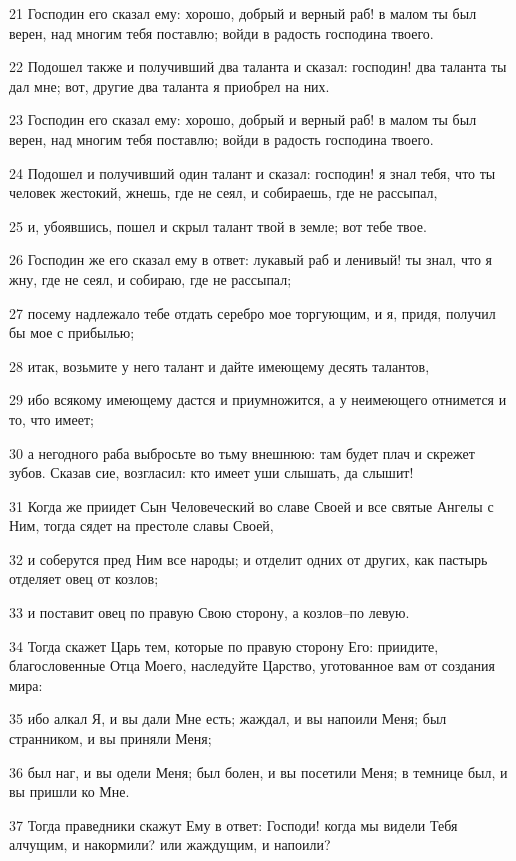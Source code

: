 \par 21 Господин его сказал ему: хорошо, добрый и верный раб! в малом ты был верен, над многим тебя поставлю; войди в радость господина твоего.
\par 22 Подошел также и получивший два таланта и сказал: господин! два таланта ты дал мне; вот, другие два таланта я приобрел на них.
\par 23 Господин его сказал ему: хорошо, добрый и верный раб! в малом ты был верен, над многим тебя поставлю; войди в радость господина твоего.
\par 24 Подошел и получивший один талант и сказал: господин! я знал тебя, что ты человек жестокий, жнешь, где не сеял, и собираешь, где не рассыпал,
\par 25 и, убоявшись, пошел и скрыл талант твой в земле; вот тебе твое.
\par 26 Господин же его сказал ему в ответ: лукавый раб и ленивый! ты знал, что я жну, где не сеял, и собираю, где не рассыпал;
\par 27 посему надлежало тебе отдать серебро мое торгующим, и я, придя, получил бы мое с прибылью;
\par 28 итак, возьмите у него талант и дайте имеющему десять талантов,
\par 29 ибо всякому имеющему дастся и приумножится, а у неимеющего отнимется и то, что имеет;
\par 30 а негодного раба выбросьте во тьму внешнюю: там будет плач и скрежет зубов. Сказав сие, возгласил: кто имеет уши слышать, да слышит!
\par 31 Когда же приидет Сын Человеческий во славе Своей и все святые Ангелы с Ним, тогда сядет на престоле славы Своей,
\par 32 и соберутся пред Ним все народы; и отделит одних от других, как пастырь отделяет овец от козлов;
\par 33 и поставит овец по правую Свою сторону, а козлов--по левую.
\par 34 Тогда скажет Царь тем, которые по правую сторону Его: приидите, благословенные Отца Моего, наследуйте Царство, уготованное вам от создания мира:
\par 35 ибо алкал Я, и вы дали Мне есть; жаждал, и вы напоили Меня; был странником, и вы приняли Меня;
\par 36 был наг, и вы одели Меня; был болен, и вы посетили Меня; в темнице был, и вы пришли ко Мне.
\par 37 Тогда праведники скажут Ему в ответ: Господи! когда мы видели Тебя алчущим, и накормили? или жаждущим, и напоили?
